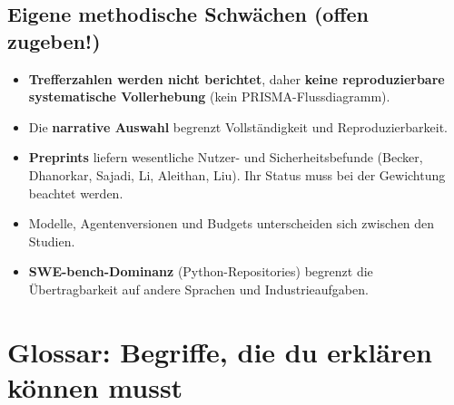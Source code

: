 \documentclass[12pt,a4paper]{article}
\begin{document}
\subsection{Eigene methodische Schwächen (offen zugeben!)}
\begin{itemize}
  \item \textbf{Trefferzahlen werden nicht berichtet}, daher \textbf{keine reproduzierbare systematische Vollerhebung} (kein PRISMA-Flussdiagramm).
  \item Die \textbf{narrative Auswahl} begrenzt Vollständigkeit und Reproduzierbarkeit.
  \item \textbf{Preprints} liefern wesentliche Nutzer- und Sicherheitsbefunde (Becker, Dhanorkar, Sajadi, Li, Aleithan, Liu). Ihr Status muss bei der Gewichtung beachtet werden.
  \item Modelle, Agentenversionen und Budgets unterscheiden sich zwischen den Studien.
  \item \textbf{SWE-bench-Dominanz} (Python-Repositories) begrenzt die Übertragbarkeit auf andere Sprachen und Industrieaufgaben.
\end{itemize}

\section{Glossar: Begriffe, die du erklären können musst}
\label{sec:glossar}
\end{document}
